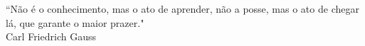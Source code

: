 \begin{epigrafe}
    \vspace*{\fill}
	\begin{flushright}
	    \parbox{0.6\linewidth}{
		
 		“Não é o conhecimento, mas o ato de aprender, não a posse, mas o ato de chegar lá, que garante o maior prazer." \\
		
		Carl Friedrich Gauss
	}
	\end{flushright}
	\vspace{2cm}
\end{epigrafe}